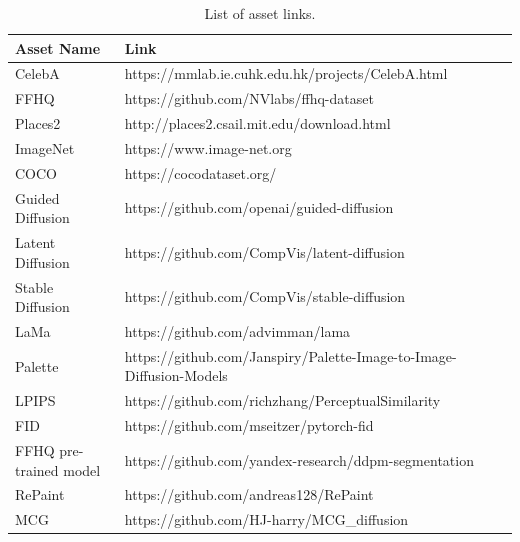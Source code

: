 \begin{table}[h]
\hspace{\sizeforappendix}
\footnotesize
\begin{tabular}{lll}
\toprule
\textbf{Asset Name} & \textbf{Link} \\
\midrule
CelebA & https://mmlab.ie.cuhk.edu.hk/projects/CelebA.html \\
FFHQ &  https://github.com/NVlabs/ffhq-dataset \\
Places2 &  http://places2.csail.mit.edu/download.html \\
ImageNet & https://www.image-net.org \\
COCO & https://cocodataset.org/ \\
Guided Diffusion & https://github.com/openai/guided-diffusion \\
Latent Diffusion & https://github.com/CompVis/latent-diffusion \\
Stable Diffusion & https://github.com/CompVis/stable-diffusion \\
LaMa & https://github.com/advimman/lama \\
Palette & https://github.com/Janspiry/Palette-Image-to-Image-Diffusion-Models \\
LPIPS &  https://github.com/richzhang/PerceptualSimilarity\\
FID & https://github.com/mseitzer/pytorch-fid \\ %
FFHQ pre-trained model & https://github.com/yandex-research/ddpm-segmentation \\ %
RePaint & https://github.com/andreas128/RePaint\\
MCG & https://github.com/HJ-harry/MCG\_diffusion\\
\bottomrule
\end{tabular}
\caption{List of asset links.}
\label{tab:linkschap3}
\end{table}



